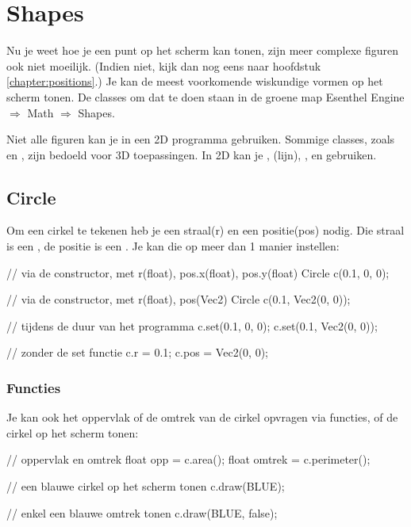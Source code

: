 \chapter{Shapes}

Nu je weet hoe je een punt op het scherm kan tonen, zijn meer complexe figuren ook niet moeilijk. (Indien niet, kijk dan nog eens naar hoofdstuk \ref{chapter:positions}.) Je kan de meest voorkomende wiskundige vormen op het scherm tonen. De classes om dat te doen staan in de groene map Esenthel Engine $\Rightarrow$ Math $\Rightarrow$ Shapes.

Niet alle figuren kan je in een 2D programma gebruiken. Sommige classes, zoals  en , zijn bedoeld voor 3D toepassingen. In 2D kan je ,  (lijn), ,  en  gebruiken.

\section{Circle}
Om een cirkel te tekenen heb je een straal(r) en een positie(pos) nodig. Die straal is een , de positie is een . Je kan die op meer dan 1 manier instellen:

\begin{code}
// via de constructor, met r(float), pos.x(float), pos.y(float)
Circle c(0.1, 0, 0);

// via de constructor, met r(float), pos(Vec2)
Circle c(0.1, Vec2(0, 0));

// tijdens de duur van het programma
c.set(0.1, 0, 0);
c.set(0.1, Vec2(0, 0));

// zonder de set functie
c.r = 0.1;
c.pos = Vec2(0, 0);
\end{code}

\subsection{Functies}
Je kan ook het oppervlak of de omtrek van de cirkel opvragen via functies, of de cirkel op het scherm tonen:

\begin{code}
// oppervlak en omtrek
float opp = c.area();
float omtrek = c.perimeter();

// een blauwe cirkel op het scherm tonen
c.draw(BLUE);

// enkel een blauwe omtrek tonen
c.draw(BLUE, false);
\end{code}

